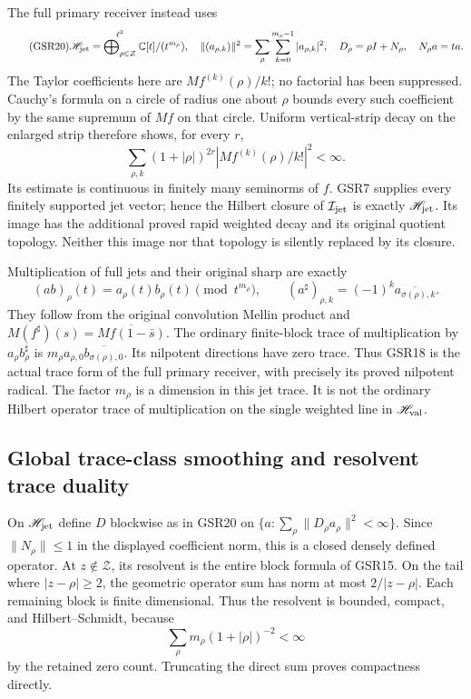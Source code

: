 The full primary receiver instead uses
\begin{equation}\tag{GSR20}
 \mathscr H_{\rm jet}=
   \mathop{\bigoplus\nolimits_{\rho\in\mathcal Z}}^{\ell^2}
       \mathbb C[t]/(t^{m_\rho}),
 \quad
 \|(a_{\rho,k})\|^2=\sum_\rho\sum_{k=0}^{m_\rho-1}|a_{\rho,k}|^2,
 \quad D_\rho=\rho I+N_\rho,\quad N_\rho a=t a .
\end{equation}
The Taylor coefficients here are
$Mf^{(k)}(\rho)/k!$; no factorial
has been suppressed.
Cauchy's formula on a circle of
radius one about $\rho$ bounds
every such coefficient by the
same supremum of $Mf$ on that
circle. Uniform vertical-strip
decay on the enlarged strip
therefore shows, for every $r$,
\[
 \sum_{\rho,k}(1+|\rho|)^{2r}
            |Mf^{(k)}(\rho)/k!|^2<\infty .
\]
Its estimate is continuous in
finitely many seminorms of $f$.
GSR7 supplies every finitely
supported jet vector; hence the
Hilbert closure of
$\mathcal I_{\rm jet}$ is exactly
$\mathscr H_{\rm jet}$. Its image
has the additional proved rapid
weighted decay and its original
quotient topology. Neither this
image nor that topology is
silently replaced by its closure.

Multiplication of full jets and
their original sharp are exactly
\begin{equation}\tag{GSR21}
 (ab)_\rho(t)=a_\rho(t)b_\rho(t)\pmod{t^{m_\rho}},
 \qquad
 (a^\sharp)_{\rho,k}
              =(-1)^k\overline{a_{\sigma(\rho),k}}.
\end{equation}
They follow from the original
convolution Mellin product and
$M(f^\sharp)(s)=\overline{Mf(1-\bar s)}$.
The ordinary finite-block trace
of multiplication by
$a_\rho b_\rho^\sharp$ is
$m_\rho a_{\rho,0}
\overline{b_{\sigma(\rho),0}}$.
Its nilpotent directions have
zero trace. Thus GSR18 is the
actual trace form of the full
primary receiver, with precisely
its proved nilpotent radical.
The factor $m_\rho$ is a
dimension in this jet trace.
It is not the ordinary Hilbert
operator trace of multiplication
on the single weighted line in
$\mathscr H_{\rm val}$.

\subsection{Global trace-class smoothing and resolvent trace duality}

On $\mathscr H_{\rm jet}$ define
$D$ blockwise as in GSR20 on
$\{a:\sum_\rho\|D_\rho a_\rho\|^2<\infty\}$.
Since $\|N_\rho\|\le1$ in the
displayed coefficient norm,
this is a closed densely defined
operator. At $z\notin\mathcal Z$,
its resolvent is the entire
block formula of GSR15.
On the tail where $|z-\rho|\ge2$,
the geometric operator sum has
norm at most $2/|z-\rho|$.
Each remaining block is finite
dimensional. Thus the resolvent
is bounded, compact, and
Hilbert--Schmidt, because
\[
 \sum_\rho m_\rho(1+|\rho|)^{-2}<\infty
\]
by the retained zero count.
Truncating the direct sum proves
compactness directly.

